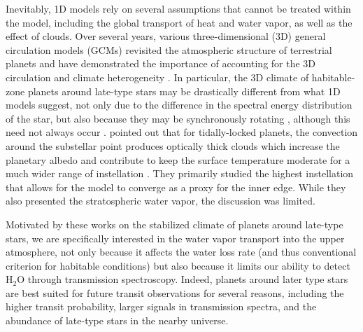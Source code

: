 \documentclass[11pt,numberedappendix,twocolappendix,]{emulateapj}
\def\water{H$_2$O }
\begin{document}
Inevitably, 1D models rely on several assumptions that cannot be treated within the model, including the global transport of heat and water vapor, as well as the effect of clouds. 
Over several years, various three-dimensional (3D) general circulation models (GCMs) revisited the atmospheric structure of terrestrial planets and have demonstrated the importance of accounting for the 3D circulation and climate heterogeneity \citep[e.g.][]{Ishiwatari2002,Abe2011,Leconte2013a,Leconte2013b,Wolf2014,Wolf2015}. 
In particular, the 3D climate of habitable-zone planets around late-type stars may be drastically different from what 1D models suggest, not only due to the difference in the spectral energy distribution of the star, but also because they may be synchronously rotating \citep{Dole1964, Kasting1993}, although this need not always occur \citep{Goldreich1966,Leconte2015}.  
%
\citet{Yang2013} pointed out that for tidally-locked planets, the convection around the substellar point produces optically thick clouds which increase the planetary albedo and contribute to keep the surface temperature moderate for a much wider range of instellation \citep[see also][]{Yang2014,Way2015,Kopparapu2016}. 
They primarily studied the highest instellation that allows for the model to converge as a proxy for the inner edge. 
While they also presented the stratospheric water vapor, the discussion was limited. 

Motivated by these works on the stabilized climate of planets around late-type stars, we are specifically interested in the water vapor transport into the upper atmosphere, not only because it affects the water loss rate (and thus conventional criterion for habitable conditions) but also because it limits our ability to detect \water through transmission spectroscopy. 
%
Indeed, planets around later type stars are best suited for future transit observations for several reasons, including the higher transit probability, larger signals in transmission spectra, and the abundance of late-type stars in the nearby universe. 
\end{document}
